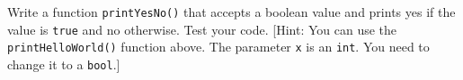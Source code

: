 Write a function \texttt{printYesNo()} that accepts a boolean value and prints yes if the value is \texttt{true} and no otherwise. Test your code. [Hint: You can use the \texttt{printHelloWorld()} function above. The parameter \texttt{x} is an \texttt{int}. You need to change it to a \texttt{bool}.]


